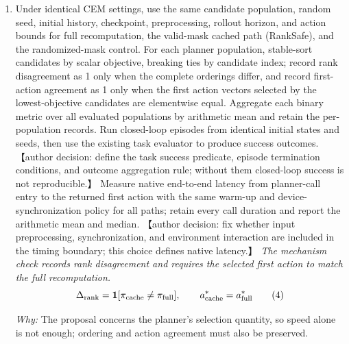 \documentclass[10pt,a4paper]{article}
\begin{document}
\begin{enumerate}[leftmargin=*,start=3]
  \item Under identical CEM settings, use the same candidate population, random seed, initial history, checkpoint, preprocessing, rollout horizon, and action bounds for full recomputation, the valid-mask cached path (RankSafe), and the randomized-mask control. For each planner population, stable-sort candidates by scalar objective, breaking ties by candidate index;\allowbreak{} record rank disagreement as 1 only when the complete orderings differ, and record first-action agreement as 1 only when the first action vectors selected by the lowest-objective candidates are elementwise equal. Aggregate each binary metric over all evaluated populations by arithmetic mean and retain the per-population records. Run closed-loop episodes from identical initial states and seeds, then use the existing task evaluator to produce success outcomes. 【author decision: define the task success predicate, episode termination conditions, and outcome aggregation rule;\allowbreak{} without them closed-loop success is not reproducible.】 Measure native end-to-end latency from planner-call entry to the returned first action with the same warm-up and device-synchronization policy for all paths;\allowbreak{} retain every call duration and report the arithmetic mean and median. 【author decision: fix whether input preprocessing, synchronization, and environment interaction are included in the timing boundary;\allowbreak{} this choice defines native latency.】
\noindent\emph{The mechanism check records rank disagreement and requires the selected first action to match the full recomputation.}
\begin{equation}
\resizebox{\ifdim\width>\linewidth \linewidth\else\width\fi}{!}{$\displaystyle \Delta_{\mathrm{rank}} = \mathbf{1}[\pi_{\mathrm{cache}} \neq \pi_{\mathrm{full}}], \qquad a^*_{\mathrm{cache}} = a^*_{\mathrm{full}}$} \tag{4}
\end{equation}
\par\emph{Why:} The proposal concerns the planner's selection quantity, so speed alone is not enough;\allowbreak{} ordering and action agreement must also be preserved.
\end{enumerate}
\end{document}
